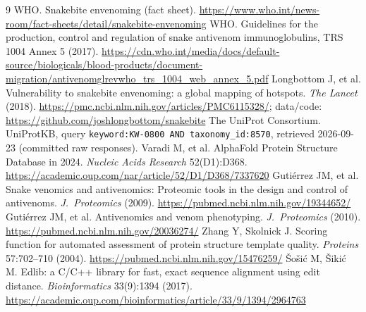 \documentclass[11pt]{article}
\begin{document}
\begin{thebibliography}{9}\small
{} WHO. Snakebite envenoming (fact sheet). \url{https://www.who.int/news-room/fact-sheets/detail/snakebite-envenoming}
 WHO. Guidelines for the production, control and regulation of snake antivenom immunoglobulins, TRS 1004 Annex 5 (2017). \url{https://cdn.who.int/media/docs/default-source/biologicals/blood-products/document-migration/antivenomglrevwho_trs_1004_web_annex_5.pdf}
 Longbottom J, et al. Vulnerability to snakebite envenoming: a global mapping of hotspots. \emph{The Lancet} (2018). \url{https://pmc.ncbi.nlm.nih.gov/articles/PMC6115328/}; data/code: \url{https://github.com/joshlongbottom/snakebite}
 The UniProt Consortium. UniProtKB, query \texttt{keyword:KW-0800 AND taxonomy\_id:8570}, retrieved 2026-09-23 (committed raw responses).
 Varadi M, et al. AlphaFold Protein Structure Database in 2024. \emph{Nucleic Acids Research} 52(D1):D368. \url{https://academic.oup.com/nar/article/52/D1/D368/7337620}
 Guti\'errez JM, et al. Snake venomics and antivenomics: Proteomic tools in the design and control of antivenoms. \emph{J.\ Proteomics} (2009). \url{https://pubmed.ncbi.nlm.nih.gov/19344652/}
 Guti\'errez JM, et al. Antivenomics and venom phenotyping. \emph{J.\ Proteomics} (2010). \url{https://pubmed.ncbi.nlm.nih.gov/20036274/}
 Zhang Y, Skolnick J. Scoring function for automated assessment of protein structure template quality. \emph{Proteins} 57:702--710 (2004). \url{https://pubmed.ncbi.nlm.nih.gov/15476259/}
 \v{S}o\v{s}i\'c M, \v{S}iki\'c M. Edlib: a C/C++ library for fast, exact sequence alignment using edit distance. \emph{Bioinformatics} 33(9):1394 (2017). \url{https://academic.oup.com/bioinformatics/article/33/9/1394/2964763}
\end{thebibliography}
\end{document}
